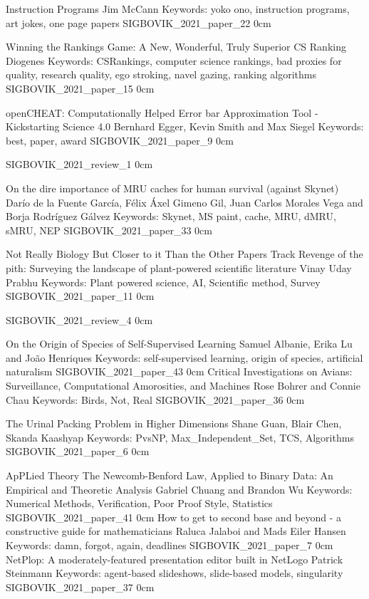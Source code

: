 \addpaper
    {Instruction Programs}
    {Jim McCann}
    {Keywords: yoko ono, instruction programs, art jokes, one page papers}
    {SIGBOVIK_2021_paper_22}
    {0cm}
    {}

\addpaper
    {Winning the Rankings Game: A New, Wonderful, Truly Superior CS Ranking}
    {Diogenes}
    {Keywords: CSRankings, computer science rankings, bad proxies for quality, research quality, ego stroking, navel gazing, ranking algorithms}
    {SIGBOVIK_2021_paper_15}
    {0cm}
    {}

\addpaper
    {openCHEAT: Computationally Helped Error bar Approximation Tool - Kickstarting Science 4.0}
    {Bernhard Egger, Kevin Smith and Max Siegel} %
    {Keywords: best, paper, award}
    {SIGBOVIK_2021_paper_9}
    {0cm}
    {}


\addreview
    {SIGBOVIK_2021_review_1}
    {0cm}


\addpaper
    {On the dire importance of MRU caches for human survival (against Skynet)}
    {Darío de la Fuente García, Félix Áxel Gimeno Gil, Juan Carlos Morales Vega and Borja Rodríguez Gálvez}
    {Keywords: Skynet, MS paint, cache, MRU, dMRU, sMRU, NEP}
    {SIGBOVIK_2021_paper_33}
    {0cm}
    {}


\addtrack
    {}{Not Really Biology But Closer to it Than the Other Papers Track}
\addpaper
    {Revenge of the pith: Surveying the landscape of plant-powered scientific literature}
    {Vinay Uday Prabhu}
    {Keywords: Plant powered science, AI, Scientific method, Survey}
    {SIGBOVIK_2021_paper_11}
    {0cm}
    {}

\addreview
    {SIGBOVIK_2021_review_4}
    {0cm}


\addpaper
    {On the Origin of Species of Self-Supervised Learning}
    {Samuel Albanie, Erika Lu and João Henriques}
    {Keywords: self-supervised learning, origin of species, artificial naturalism}
    {SIGBOVIK_2021_paper_43}
    {0cm}
    {}
\addpaper
    {Critical Investigations on Avians: Surveillance, Computational Amorosities, and Machines}
    {Rose Bohrer and Connie Chau}
    {Keywords: Birds, Not, Real}
    {SIGBOVIK_2021_paper_36}
    {0cm}
    {}

\addpaper
    {The Urinal Packing Problem in Higher Dimensions}
    {Shane Guan, Blair Chen, Skanda Kaashyap}
    {Keywords: PvsNP, Max\_Independent\_Set, TCS, Algorithms}
    {SIGBOVIK_2021_paper_6}
    {0cm}
    {}

\addtrack
    {}{ApPLied Theory}
\addpaper
    {The Newcomb-Benford Law, Applied to Binary Data: An Empirical and Theoretic Analysis}
    {Gabriel Chuang and Brandon Wu}
    {Keywords: Numerical Methods, Verification, Poor Proof Style, Statistics}
    {SIGBOVIK_2021_paper_41}
    {0cm}
    {}
\addpaper
    {How to get to second base and beyond - a constructive guide for mathematicians}
    {Raluca Jalaboi and Mads Eiler Hansen}
    {Keywords: damn, forgot, again, deadlines}
    {SIGBOVIK_2021_paper_7}
    {0cm}
    {}
\addpaper
    {NetPlop: A moderately-featured presentation editor built in NetLogo}
    {Patrick Steinmann}
    {Keywords: agent-based slideshows, slide-based models, singularity}
    {SIGBOVIK_2021_paper_37}
    {0cm}
    {}


